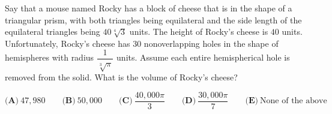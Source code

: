Say that a mouse named Rocky has a block of cheese that is in the shape of a triangular prism, with both triangles being equilateral and the side length of the equilateral triangles being $40\sqrt[4]{3}$ units. The height of Rocky's cheese is $40$ units. Unfortunately, Rocky's cheese has $30$ nonoverlapping holes in the shape of hemispheres with radius $\dfrac{1}{\sqrt[3]{\pi}}$ units. Assume each entire hemispherical hole is removed from the solid. What is the volume of Rocky's cheese?

$\textbf{(A)}~47,980\qquad\textbf{(B)}~50,000\qquad\textbf{(C)}~\dfrac{40,000\pi}{3}\qquad\textbf{(D)}~\dfrac{30,000\pi}{7}\qquad\textbf{(E)}~\text{None of the above}\qquad$

